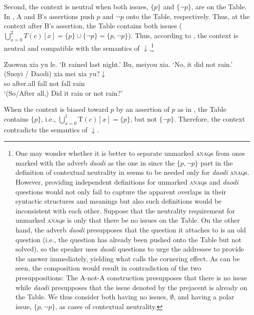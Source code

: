 \documentclass[output=paper,colorlinks,citecolor=brown]{langscibook}
\begin{document}
	
Second, the context is neutral when both issues, $\{p\}$ and $\{\neg p\}$, are on the Table.  In , A and B's assertions push $p$ and $\neg p$ onto the Table, respectively.  Thus, at the context after B's assertion, the Table contains both issues ($\bigcup_{x=0}^{2} {T}({c})[{x}] = \{p\}\cup\{\neg p\}=\{p, \neg p\}$).  Thus, according to , the context is neutral and compatible with the semantics of $\downarrow$.\footnote{One may wonder whether it is better to separate unmarked \textsc{anaq}s from ones marked with the adverb \emph{daodi} as the one in  since the $\{p, \neg p\}$ part in the definition of contextual neutrality in   seems to be needed only for \emph{daodi} \textsc{anaq}s.  However, providing independent definitions for unmarked \textsc{anaq}s and \emph{daodi}  questions would not only fail to capture the apparent overlaps in their syntactic structures and   meanings but also such definitions would be inconsistent with each other. Suppose that the neutrality requirement for unmarked \textsc{anaq}s is only that there be no issues on the Table.  On the other hand, the adverb \textit{daodi} presupposes that the question it attaches to is an old question (i.e., the question has already been pushed onto the Table but not solved), so the speaker uses  \textit{daodi} questions to urge the addressee to provide the answer immediately, yielding what \citet{Biezma} calls the cornering effect.  As can be seen, the composition would result in contradiction of the two presuppositions:  The A-not-A construction presupposes that there is no issue while \textit{daodi} presupposes that the issue denoted by the prejacent is already on the Table.  We thus consider both having no issues, $\emptyset$, and having a polar issue, $\{p, \neg p\}$, as cases of contextual neutrality.}
	
\ea\label{neutral2}
\begin{xlist}
 Zuowan xia yu le.
\glt `It rained last night.'
 Bu, meiyou xia. 
\glt `No, it did not rain.'
 \gll (Suoyi / Daodi) xia mei xia yu?$\downarrow$\\
so {} after.all fall not fall rain\\
\glt `(So/After all,) Did it rain or not rain?' 
\end{xlist}
\z
	
	
When the context is biased toward $p$ by an assertion of $p$ as in , the Table contains $\{p\}$, i.e., $\bigcup_{x=0}^{1} \mathrm{T}(c)[{x}] = \{p\}$, but not $\{\neg p\}$.  Therefore, the context contradicts the semantics of $\downarrow$.
\end{document}

